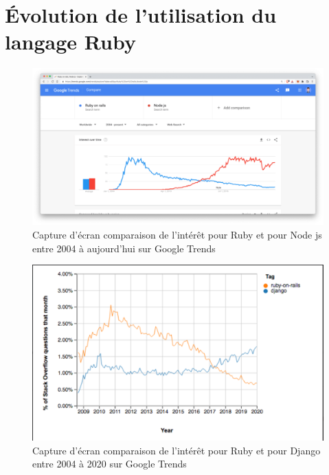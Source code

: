\section{Évolution de l'utilisation du langage Ruby}

\begin{figure}[H]
        \centering
        \includegraphics[width=15cm]{images/google-trends-ruby-vs-node.png}
        \caption{Capture d'écran comparaison de l'intérêt pour Ruby et pour Node js entre 2004 à aujourd'hui sur Google Trends}
        \label{fig:RubyvsNodejs}
\end{figure}

\begin{figure}[H]
        \centering
        \includegraphics[width=15cm]{images/Ruby_vs_Django_trend.png}
        \caption{Capture d'écran comparaison de l'intérêt pour Ruby et pour Django entre 2004 à 2020 sur Google Trends}
        \label{fig:RubyvsDjango}
\end{figure}


